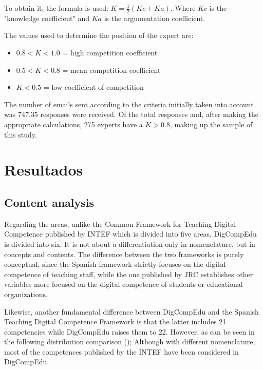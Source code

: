 \documentclass{textolivre}
\begin{document}
To obtain it, the formula is used: $K = \frac{1}{2} (Kc + Ka)$. Where $Kc$ is
the "knowledge coefficient" and $Ka$ is the argumentation coefficient.

The values used to determine the position of the expert are:
\begin{itemize}
\item $0.8 < K < 1.0$ = high competition coefficient
\item $0.5 < K < 0.8$ = mean competition coefficient
\item $K < 0.5$ = low coefficient of competition
\end{itemize}

The number of emails sent according to the criteria initially taken into
account was 747.35 responses were received. Of the total responses and, after
making the appropriate calculations, 275 experts have a $K > 0.8$, making up
the sample of this study.



\section{Resultados}
\subsection{Content analysis}
Regarding the areas, unlike the Common Framework for Teaching Digital
Competence published by INTEF which is divided into five areas, DigCompEdu is
divided into six. It is not about a differentiation only in nomenclature, but
in concepts and contents. The difference between the two frameworks is purely
conceptual, since the Spanish framework strictly focuses on the digital
competence of teaching staff, while the one published by JRC establishes other
variables more focused on the digital competence of students or educational
organizations.

Likewise, another fundamental difference between DigCompEdu and the Spanish
Teaching Digital Competence Framework is that the latter includes 21
competencies while DigCompEdu raises them to 22. However, as can be seen in the
following distribution comparison (); Although with different
nomenclature, most of the competences published by the INTEF have been
considered in DigCompEdu.
\end{document}
